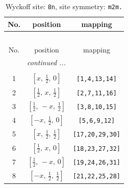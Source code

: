 \documentclass[fleqn,8pt]{jsarticle}
\begin{document}
\begin{longtable}{ccc}
\caption{Wyckoff site: {\tt 8n}, site symmetry: {\tt m2m.}}
 \\
 \hline \hline
No. & position & mapping \\ \hline \endfirsthead

\multicolumn{2}{l}{\tablename\ \thetable{}} \\
 \hline \hline
No. & position & mapping \\ \hline \endhead

 \hline \hline
\multicolumn{2}{r}{\footnotesize\it continued ...} \\ \endfoot

 \hline \hline
\multicolumn{2}{r}{} \\ \endlastfoot

1 & $\left[ x,\, \frac{1}{2},\, 0 \right]$ & {\tt [1,4,13,14]} \\ \hline
2 & $\left[ \frac{1}{2},\, x,\, \frac{1}{2} \right]$ & {\tt [2,7,11,16]} \\ \hline
3 & $\left[ \frac{1}{2},\, - x,\, \frac{1}{2} \right]$ & {\tt [3,8,10,15]} \\ \hline
4 & $\left[ - x,\, \frac{1}{2},\, 0 \right]$ & {\tt [5,6,9,12]} \\ \hline
5 & $\left[ x,\, \frac{1}{2},\, \frac{1}{2} \right]$ & {\tt [17,20,29,30]} \\ \hline
6 & $\left[ \frac{1}{2},\, x,\, 0 \right]$ & {\tt [18,23,27,32]} \\ \hline
7 & $\left[ \frac{1}{2},\, - x,\, 0 \right]$ & {\tt [19,24,26,31]} \\ \hline
8 & $\left[ - x,\, \frac{1}{2},\, \frac{1}{2} \right]$ & {\tt [21,22,25,28]} \\
\end{longtable}
\renewcommand{\arraystretch}{1.2}
\end{document}
